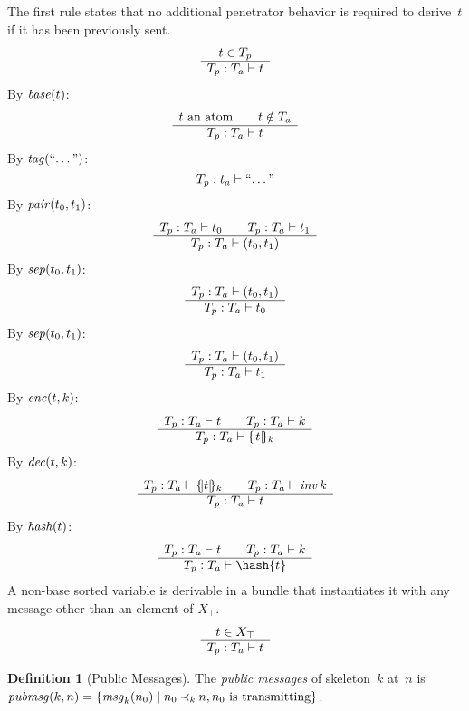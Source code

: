 \documentclass[12pt]{report}
\theoremstyle{definition}
\newtheorem{defn}{Definition}[chapter]
\newcommand{\pubmsg}{\fn{pubmsg}}
\newcommand{\msg}{\fn{msg}}
\begin{document}
The first rule states that no additional penetrator behavior is required
to derive~$t$ if it has been previously sent.
\begin{equation}
  \infer{t\in{T_p}}{\der{t}{T_p}{T_a}}
\end{equation}
%
By $\fn{base}(t)$:
\begin{equation}\label{eqn:base}
  \infer{\mbox{$t$ an atom}\qquad t\notin T_a}{\der{t}{T_p}{T_a}}
\end{equation}
%
By $\fn{tag}(\mbox{``\ldots''})$:
\begin{equation}\label{eqn:tag}
  \der{\mbox{``\ldots''}}{T_p}{t_a}
\end{equation}
%
By $\fn{pair}(t_0,t_1)$:
\begin{equation}\label{eqn:pair}
  \infer{\der{t_0}{T_p}{T_a}\qquad\der{t_1}{T_p}{T_a}}
        {\der{(t_0,t_1)}{T_p}{T_a}}
\end{equation}
%
By $\fn{sep}(t_0,t_1)$:
\begin{equation}\label{eqn:sep0}
  \infer{\der{(t_0,t_1)}{T_p}{T_a}}{\der{t_0}{T_p}{T_a}}
\end{equation}
%
By $\fn{sep}(t_0,t_1)$:
\begin{equation}\label{eqn:sep1}
  \infer{\der{(t_0,t_1)}{T_p}{T_a}}{\der{t_1}{T_p}{T_a}}
\end{equation}
%
By $\fn{enc}(t,k)$:
\begin{equation}\label{eqn:enc}
  \infer{\der{t}{T_p}{T_a}\qquad\der{k}{T_p}{T_a}}{\der{\enc{t}{k}}{T_p}{T_a}}
\end{equation}
%
By $\fn{dec}(t,k)$:
\begin{equation}\label{eqn:dec}
  \infer{\der{\enc{t}{k}}{T_p}{T_a}\qquad\der{\fn{inv}{k}}{T_p}{T_a}}{\der{t}{T_p}{T_a}}
\end{equation}
%
By $\fn{hash}(t)$:
\begin{equation}\label{eqn:hash}
  \infer{\der{t}{T_p}{T_a}\qquad\der{k}{T_p}{T_a}}{\der{\hash{t}}{T_p}{T_a}}
\end{equation}
%
A non-base sorted variable is derivable in a bundle that instantiates
it with any message other than an element of $X_\top$.
\begin{equation}\label{eqn:top}
  \infer{t\in X_\top}{\der{t}{T_p}{T_a}}
\end{equation}

\begin{defn}[Public Messages]
The \emph{public messages} of
skeleton~$k$ at~$n$ is $\pubmsg(k,n)=\{\msg_k(n_0)\mid n_0 \kprec{k}
n, n_0\mbox{~is transmitting}\}$.
\end{defn}
\end{document}
